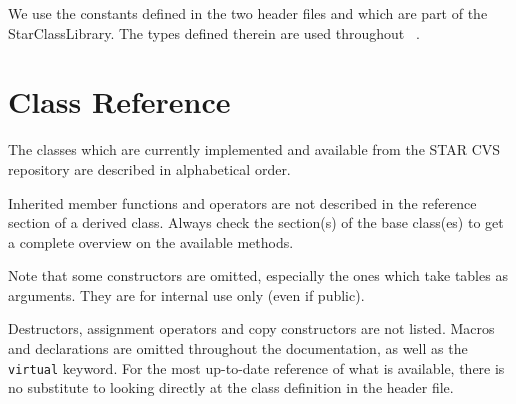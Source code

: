 We use the constants defined in the two header files
  and
 which are part of the StarClassLibrary.
The types defined therein are used
throughout \StMcEvent\ .




\section{Class Reference}
The classes which are currently implemented and available from the
STAR CVS repository are described in alphabetical order.

Inherited member functions and operators are not described in the
reference section of a derived class. Always check the section(s)
of the base class(es) to get a complete overview on the available
methods.

Note that some constructors are omitted, especially the ones which
take tables as arguments. They are for internal use only (even if
public).

Destructors, assignment operators and copy constructors are not
listed.  Macros and  declarations are omitted throughout the
documentation, as well as the {\tt virtual} keyword.  For the
most up-to-date reference of what is available, there is no
substitute to looking directly at the class definition in
the header file.

\clearpage

%
%
